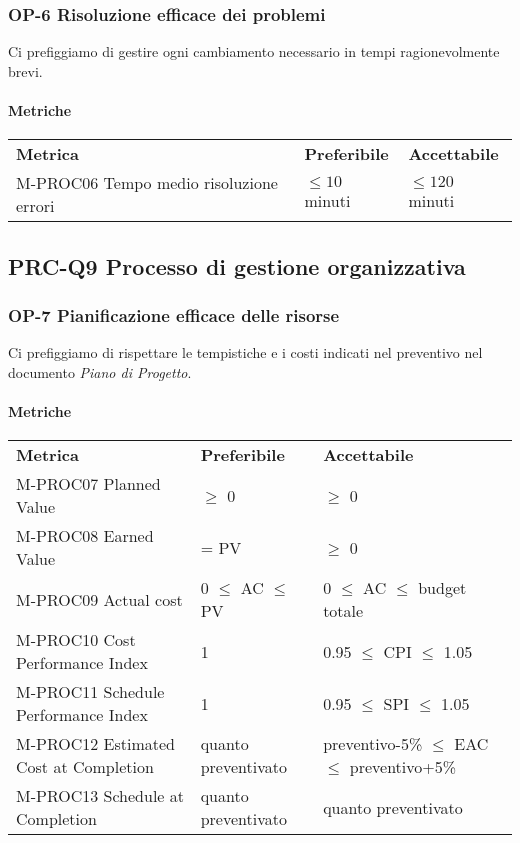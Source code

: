 		\subsubsection{OP-6 Risoluzione efficace dei problemi}
			Ci prefiggiamo di gestire ogni cambiamento necessario in tempi ragionevolmente brevi.
			\paragraph{Metriche} \mbox{}			
			\begin{longtable} {
					>{}p{80mm} 
					>{}p{25mm}
					>{}p{25mm}
				}
				\rowcolor{gray!50}
				\textbf{Metrica} & \textbf{Preferibile} & \textbf{Accettabile} \TBstrut \TBstrut \\
				M-PROC06 Tempo medio risoluzione errori & $\le 10$ minuti & $\le 120$ minuti \TBstrut \\ [2mm]
			\end{longtable}					

	\subsection{PRC-Q9 Processo di gestione organizzativa}
		\subsubsection{OP-7 Pianificazione efficace delle risorse}
			Ci prefiggiamo di rispettare le tempistiche e i costi indicati nel preventivo nel documento \textit{Piano di Progetto}.
			\paragraph{Metriche} \mbox{} 
			\begin{longtable} {
					>{}p{60mm} 
					>{}p{35mm}
					>{}p{50mm}
				}
				\rowcolor{gray!50}
				\textbf{Metrica} & \textbf{Preferibile} & \textbf{Accettabile} \TBstrut \TBstrut \\
				M-PROC07 Planned Value & $\ge$ 0 & $\ge$ 0 \TBstrut \\ [2mm]
				M-PROC08 Earned Value & = PV & $\ge$ 0 \TBstrut \\ [2mm]
				M-PROC09 Actual cost & 0 $\le$ AC $\le$ PV &0 $\le$ AC $\le$ budget totale \TBstrut \\ [2mm]				
				M-PROC10 Cost Performance Index & 1 & 0.95 $\le$ CPI $\le$ 1.05 \TBstrut \\ [2mm]				
				M-PROC11 Schedule Performance Index & 1 & 0.95 $\le$ SPI $\le$ 1.05 \TBstrut \\ [2mm]				
				M-PROC12 Estimated Cost at Completion & quanto preventivato & preventivo-5\% $\le$ EAC $\le$ preventivo+5\% \TBstrut \\ [2mm]
				M-PROC13 Schedule at Completion & quanto preventivato & quanto preventivato \TBstrut \\ [2mm]				
			\end{longtable}

